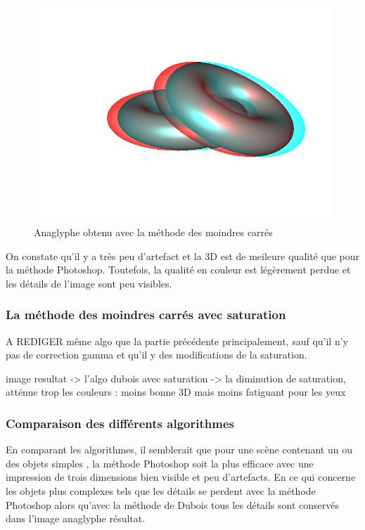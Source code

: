 \begin{figure}[h]
	\centering
	\includegraphics[scale=0.3]{moindreCarres.png}
	\caption{\label{fig:moindresCarres} Anaglyphe obtenu avec la méthode des moindres carrés \protect}
\end{figure}
	
	On constate qu'il y a très peu d'artefact et la 3D est de meileure qualité que pour la méthode Photoshop. Toutefois, la qualité en couleur est légèrement perdue et les détails de l'image sont peu visibles. 
	

\subsubsection{La méthode des moindres carrés avec saturation}


A REDIGER
même algo que la partie précédente principalement, sauf qu'il n'y pas de correction gamma et qu'il y des modifications de la saturation.

image resultat -> l'algo dubois avec saturation -> la diminution de saturation, atténue trop les couleurs : moins bonne 3D mais moins fatiguant pour les yeux 

\subsubsection{Comparaison des différents algorithmes}

En comparant les algorithmes, il semblerait que pour une scène contenant un ou des objets simples %
, la méthode Photoshop soit la plus efficace avec une impression de trois dimensions bien visible et peu d'artefacts. En ce qui concerne les objets plus complexes tels que %
les détails se perdent avec la méthode Photoshop alors qu'avec la méthode de Dubois tous les détails sont conservés dans l'image anaglyphe résultat. 

